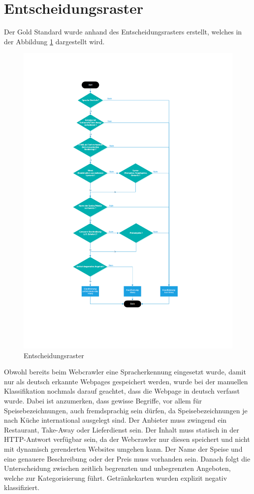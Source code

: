 \section{Entscheidungsraster}
Der Gold Standard wurde anhand des Entscheidungsrasters erstellt, welches in der Abbildung \cref{fig:classificationtree} dargestellt wird.
\begin{figure}[H]	
	\includegraphics[width=1\columnwidth,keepaspectratio]{img/man-classification-tree.png}
	\caption{Entscheidungsraster}
	\label{fig:classificationtree}
\end{figure}
Obwohl bereits beim Webcrawler eine Spracherkennung eingesetzt wurde, damit nur als deutsch erkannte Webpages gespeichert werden, wurde bei der manuellen Klassifikation nochmals darauf geachtet, dass die Webpage in deutsch verfasst wurde.
Dabei ist anzumerken, dass gewisse Begriffe, vor allem für Speisebezeichnungen, auch fremdsprachig sein dürfen, da Speisebezeichnungen je nach Küche international ausgelegt sind.
Der Anbieter muss zwingend ein Restaurant, Take-Away oder Lieferdienst sein.
Der Inhalt muss statisch in der HTTP-Antwort verfügbar sein, da der Webcrawler nur diesen speichert und nicht mit dynamisch gerenderten Websites umgehen kann.
Der Name der Speise und eine genauere Beschreibung oder der Preis muss vorhanden sein.
Danach folgt die Unterscheidung zwischen zeitlich begrenzten und unbegrenzten Angeboten, welche zur Kategorisierung führt.
Getränkekarten wurden explizit negativ klassifiziert.
